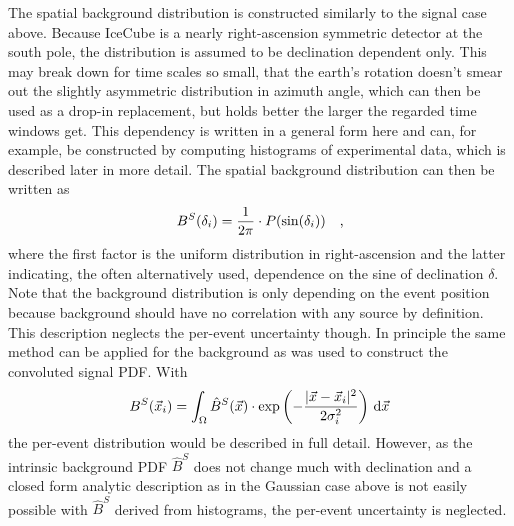 The spatial background distribution is constructed similarly to the signal case above.
Because IceCube is a nearly right-ascension symmetric detector at the south pole, the distribution is assumed to be declination dependent only.
This may break down for time scales so small, that the earth's rotation doesn't smear out the slightly asymmetric distribution in azimuth angle, which can then be used as a drop-in replacement, but holds better the larger the regarded time windows get.
This dependency is written in a general form here and can, for example, be constructed by computing histograms of experimental data, which is described later in more detail.
The spatial background distribution can then be written as
\begin{equation}
  B^S(\delta_i) = \frac{1}{2\pi} \cdot P(\sin(\delta_i))
  \quad\text{,}
\end{equation}
where the first factor is the uniform distribution in right-ascension and the latter indicating, the often alternatively used, dependence on the sine of declination $\delta$.
Note that the background distribution is only depending on the event position because background should have no correlation with any source by definition.
This description neglects the per-event uncertainty though.
In principle the same method can be applied for the background as was used to construct the convoluted signal PDF.
With
\begin{equation}
  B^S(\vec{x}_i) =
    \int_\Omega \hat{B}^S(\vec{x}) \cdot
      \exp\left(-\frac{|\vec{x}-\vec{x}_i|^2}{2\sigma_i^2}\right)
      \,\mathrm{d}\vec{x}
\end{equation}
the per-event distribution would be described in full detail.
However, as the intrinsic background PDF $\hat{B}^S$ does not change much with declination and a closed form analytic description as in the Gaussian case above is not easily possible with $\hat{B}^S$ derived from histograms, the per-event uncertainty is neglected.


